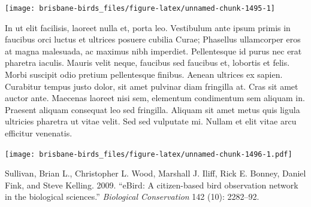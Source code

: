 \documentclass[]{book}
\let\origfigure\figure
\let\endorigfigure\endfigure
\renewenvironment{figure}[1][2] {
  \expandafter\origfigure\expandafter[H]
} {
  \endorigfigure
}
\begin{document}
\begin{figure}
\texttt{[image: brisbane-birds\_files/figure-latex/unnamed-chunk-1495-1]} \caption{insert figure caption}\label{fig:unnamed-chunk-1495}
\end{figure}

In ut elit facilisis, laoreet nulla et, porta leo. Vestibulum ante ipsum
primis in faucibus orci luctus et ultrices posuere cubilia Curae;
Phasellus ullamcorper eros at magna malesuada, ac maximus nibh
imperdiet. Pellentesque id purus nec erat pharetra iaculis. Mauris velit
neque, faucibus sed faucibus et, lobortis et felis. Morbi suscipit odio
pretium pellentesque finibus. Aenean ultrices ex sapien. Curabitur
tempus justo dolor, sit amet pulvinar diam fringilla at. Cras sit amet
auctor ante. Maecenas laoreet nisi sem, elementum condimentum sem
aliquam in. Praesent aliquam consequat leo sed fringilla. Aliquam sit
amet metus quis ligula ultricies pharetra ut vitae velit. Sed sed
vulputate mi. Nullam et elit vitae arcu efficitur venenatis.

\begin{figure}
\centering
\texttt{[image: brisbane-birds\_files/figure-latex/unnamed-chunk-1496-1.pdf]}
\caption{\label{fig:unnamed-chunk-1496}insert figure caption}
\end{figure}

\hypertarget{refs}{}
\hypertarget{ref-r1}{}
Sullivan, Brian L., Christopher L. Wood, Marshall J. Iliff, Rick E.
Bonney, Daniel Fink, and Steve Kelling. 2009. ``eBird: A citizen-based
bird observation network in the biological sciences.'' \emph{Biological
Conservation} 142 (10): 2282--92.
\end{document}
